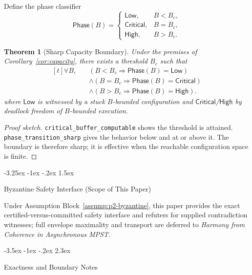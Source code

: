 \documentclass[a4paper,10pt,twocolumn,english]{article}
\makeatletter
\renewcommand{\section}{\@startsection{section}{1}{\z@}%
  {-3.5ex \@plus -1ex \@minus -.2ex}%
  {2.3ex}%
  {\raggedright\normalfont\large\bfseries}}
\renewcommand{\subsection}{\@startsection{subsection}{2}{\z@}%
  {-3.25ex \@plus -1ex \@minus -.2ex}%
  {1.5ex}%
  {\raggedright\normalfont\normalsize\bfseries}}
\numberwithin{equation}{section}
\theoremstyle{paperdef}
\theoremstyle{paperplain}
\newtheorem{theorem}[definition]{Theorem}
\theoremstyle{paperdef}
\theoremstyle{paperremark}
\newcommand{\Bc}{\ensuremath{B_c}}
\newcommand{\Phase}{\ensuremath{\mathsf{Phase}}}
\makeatother
\begin{document}
Define the phase classifier
\begin{equation}
	\Phase(B) =
	\begin{cases}
		\mathsf{Low},      & B < \Bc, \\
		\mathsf{Critical}, & B = \Bc, \\
		\mathsf{High},     & B > \Bc.
	\end{cases}
\end{equation}
\begin{theorem}[Sharp Capacity Boundary]
	\label{thm:app-p2-sharp-capacity}
	Under the premises of Corollary~\ref{cor:capacity}, there exists a threshold $\Bc$ such that
	\begin{equation}
		\begin{aligned}[t]
			\forall B,\quad
			 & (B < \Bc \Rightarrow \Phase(B)=\mathsf{Low})            \\
			 & \land (B = \Bc \Rightarrow \Phase(B)=\mathsf{Critical}) \\
			 & \land (B > \Bc \Rightarrow \Phase(B)=\mathsf{High}).
		\end{aligned}
	\end{equation}
	where $\mathsf{Low}$ is witnessed by a stuck $B$-bounded configuration and $\mathsf{Critical}$/$\mathsf{High}$ by deadlock freedom of $B$-bounded execution.
\end{theorem}

\begin{proof}[Proof sketch]
	\nolinkurl{critical_buffer_computable} shows the threshold is attained. \nolinkurl{phase_transition_sharp} gives the behavior below and at or above it. The boundary is therefore sharp; it is effective when the reachable configuration space is finite.
\end{proof}

\subsection{Byzantine Safety Interface (Scope of This Paper)}

Under Assumption Block~\ref{assump:p2-byzantine}, this paper provides the exact certified-versus-committed safety interface and refuters for supplied contradiction witnesses; full envelope maximality and transport are deferred to \emph{Harmony from Coherence in Asynchronous MPST}.

\section{Exactness and Boundary Notes}
\label{app:exactness}
\end{document}
